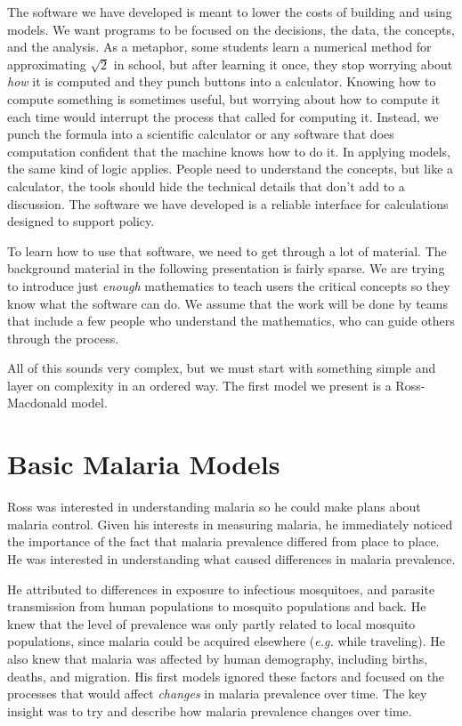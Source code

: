 \documentclass[
]{book}
\begin{document}
The software we have developed is meant to lower the costs of building and using models. We want programs to be focused on the decisions, the data, the concepts, and the analysis. As a metaphor, some students learn a numerical method for approximating \(\sqrt{2}\) in school, but after learning it once, they stop worrying about \emph{how} it is computed and they punch buttons into a calculator. Knowing how to compute something is sometimes useful, but worrying about how to compute it each time would interrupt the process that called for computing it. Instead, we punch the formula into a scientific calculator or any software that does computation confident that the machine knows how to do it. In applying models, the same kind of logic applies. People need to understand the concepts, but like a calculator, the tools should hide the technical details that don't add to a discussion. The software we have developed is a reliable interface for calculations designed to support policy.

To learn how to use that software, we need to get through a lot of material. The background material in the following presentation is fairly sparse. We are trying to introduce just \emph{enough} mathematics to teach users the critical concepts so they know what the software can do. We assume that the work will be done by teams that include a few people who understand the mathematics, who can guide others through the process.

All of this sounds very complex, but we must start with something simple and layer on complexity in an ordered way. The first model we present is a Ross-Macdonald model.

\chapter{Basic Malaria Models}\label{basic-malaria-models}

Ross was interested in understanding malaria so he could make plans about malaria control.
Given his interests in measuring malaria, he immediately noticed the importance of the fact that malaria prevalence differed from place to place.
He was interested in understanding what caused differences in malaria prevalence.

He attributed to differences in exposure to infectious mosquitoes, and parasite transmission from human populations to mosquito populations and back.
He knew that the level of prevalence was only partly related to local mosquito populations, since malaria could be acquired elsewhere (\emph{e.g.} while traveling).
He also knew that malaria was affected by human demography, including births, deaths, and migration.
His first models ignored these factors and focused on the processes that would affect \emph{changes} in malaria prevalence over time.
The key insight was to try and describe how malaria prevalence changes over time.
\end{document}
